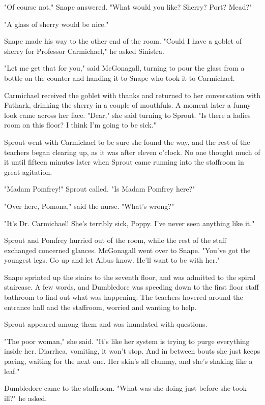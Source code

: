 "Of course not," Snape answered. "What would you like? Sherry? Port? Mead?"

"A glass of sherry would be nice."

Snape made his way to the other end of the room. "Could I have a goblet of sherry for Professor Carmichael," he asked Sinistra.

"Let me get that for you," said McGonagall, turning to pour the glass from a bottle on the counter and handing it to Snape who took it to Carmichael.

Carmichael received the goblet with thanks and returned to her conversation with Futhark, drinking the sherry in a couple of mouthfuls. A moment later a funny look came across her face. "Dear," she said turning to Sprout. "Is there a ladies room on this floor? I think I'm going to be sick."

Sprout went with Carmichael to be sure she found the way, and the rest of the teachers began clearing up, as it was after eleven o'clock. No one thought much of it until fifteen minutes later when Sprout came running into the staffroom in great agitation.

"Madam Pomfrey!" Sprout called. "Is Madam Pomfrey here?"

"Over here, Pomona," said the nurse. "What's wrong?"

"It's Dr. Carmichael! She's terribly sick, Poppy. I've never seen anything like it."

Sprout and Pomfrey hurried out of the room, while the rest of the staff exchanged concerned glances. McGonagall went over to Snape. "You've got the youngest legs. Go up and let Albus know. He'll want to be with her."

Snape sprinted up the stairs to the seventh floor, and was admitted to the spiral staircase. A few words, and Dumbledore was speeding down to the first floor staff bathroom to find out what was happening. The teachers hovered around the entrance hall and the staffroom, worried and wanting to help.

Sprout appeared among them and was inundated with questions.

"The poor woman," she said. "It's like her system is trying to purge everything inside her. Diarrhea, vomiting, it won't stop. And in between bouts she just keeps pacing, waiting for the next one. Her skin's all clammy, and she's shaking like a leaf."

Dumbledore came to the staffroom. "What was she doing just before she took ill?" he asked.

